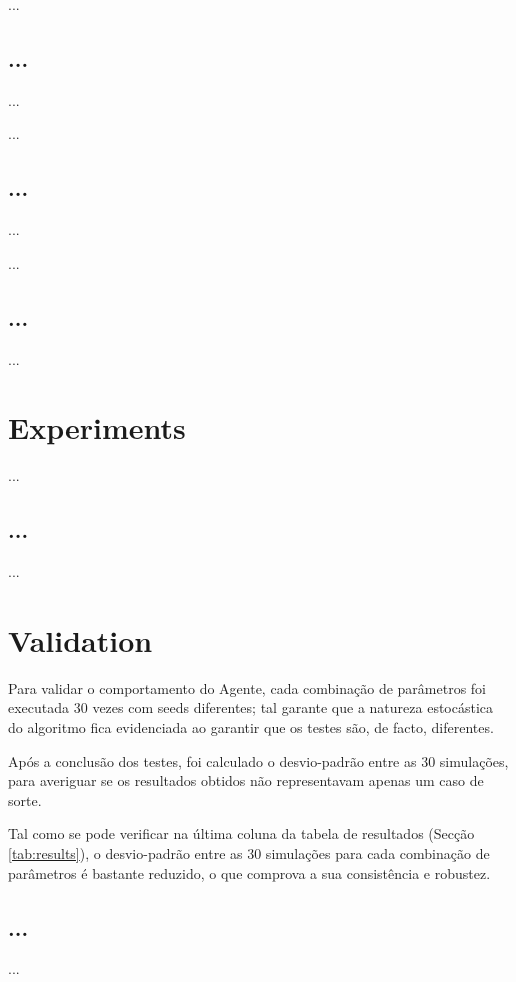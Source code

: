 \documentclass[a4paper]{article}
\begin{document}
...

\cleardoublepage
\subsection{...}
\indent \indent ...

...

\subsection{...}
\indent \indent ...

...

\subsection{...}
\indent \indent ...

\cleardoublepage

\section{Experiments}
\indent \indent ...

\cleardoublepage

\subsection{...}
\indent \indent ...

\cleardoublepage

\section{Validation}
\indent \indent Para validar o comportamento do Agente, cada combinação de parâmetros foi executada 30 vezes com seeds diferentes;
tal garante que a natureza estocástica do algoritmo fica evidenciada ao garantir que os testes são, de facto, diferentes.

Após a conclusão dos testes, foi calculado o desvio-padrão entre as 30 simulações,
para averiguar se os resultados obtidos não representavam apenas um caso de sorte.

Tal como se pode verificar na última coluna da tabela de resultados (Secção \ref{tab:results}), o desvio-padrão entre as 30 simulações para cada combinação de parâmetros
é bastante reduzido, o que comprova a sua consistência e robustez.

\cleardoublepage

\subsection{...}
\indent \indent ...
\end{document}
